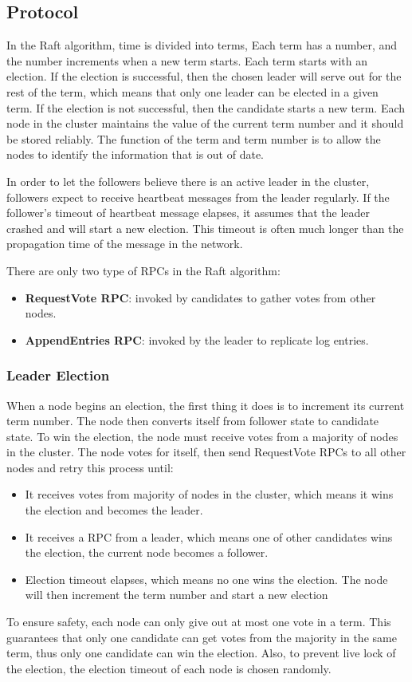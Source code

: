 \documentclass[12pt, a4paper]{article}
\begin{document}
\subsection{Protocol}
In the Raft algorithm, time is divided into terms\cite{conf/usenix/OngaroO14}, Each term has a number, and the number increments when a new term starts. Each term starts
with an election. If the election is successful, then the chosen leader will serve out for the rest of the term, which means that
only one leader can be elected in a given term. If the election is not successful, then the candidate starts a new term. Each node
in the cluster maintains the value of the current term number and it should be stored reliably. The function of the term and term number is
to allow the nodes to identify the information that is out of date.
\par
In order to let the followers believe there is an active leader in the cluster, followers expect to receive heartbeat messages from
the leader regularly. If the follower's timeout of heartbeat message elapses, it assumes that the leader crashed and will start a
new election. This timeout is often much longer than the propagation time of the message in the network.
\par
There are only two type of RPCs in the Raft algorithm:
\begin{itemize}
  \item \textbf{RequestVote RPC}: invoked by candidates to gather votes\cite{conf/usenix/OngaroO14} from other nodes.
  \item \textbf{AppendEntries RPC}: invoked by the leader to replicate log entries\cite{conf/usenix/OngaroO14}.
\end{itemize}
  \subsubsection{Leader Election}
  When a node begins an election, the first thing it does is to increment its current term number. The node then converts itself from
  follower state to candidate state. To win the election, the node must receive votes from a majority of nodes in the cluster. The node
  votes for itself, then send RequestVote RPCs to all other nodes and retry this process until:
  \begin{itemize}
    \item It receives votes from majority of nodes in the cluster, which means it wins the election and becomes the leader.
    \item It receives a RPC from a leader, which means one of other candidates wins the election, the current node becomes a follower.
    \item Election timeout elapses, which means no one wins the election. The node will then increment the term number and start a new election
  \end{itemize}
  \par
  To ensure safety, each node can only give out at most one vote in a term. This guarantees that only one candidate can get votes from
  the majority in the same term, thus only one candidate can win the election. Also, to prevent live lock of the election, the election
  timeout of each node is chosen randomly.
\end{document}
